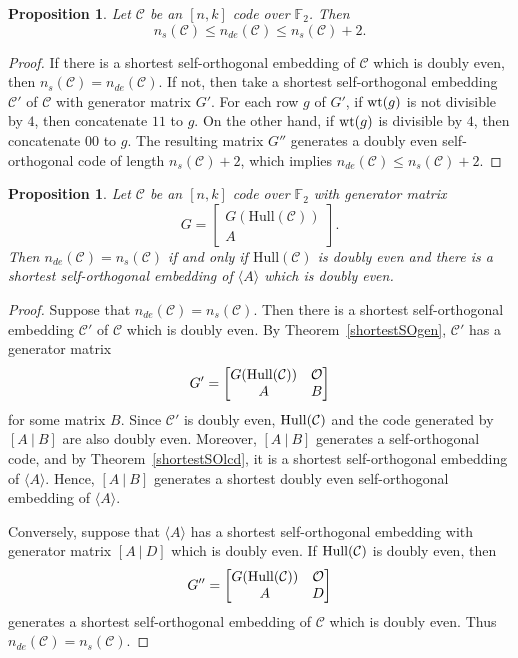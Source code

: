 \documentclass{article}
\newtheorem{proposition}[theorem]{Proposition}
\theoremstyle{definition}
\theoremstyle{remark}
\begin{document}
\begin{proposition}
    Let $\mathcal{C}$ be an $[n, k]$ code over $\mathbb{F}_2$. Then
    \[
    n_s(\mathcal{C})\le n_{de}(\mathcal{C})\le n_s(\mathcal{C})+2.
    \]
\end{proposition}
\begin{proof}
    If there is a shortest self-orthogonal embedding of $\mathcal{C}$ which is doubly even, then $n_s(\mathcal{C})=n_{de}(\mathcal{C})$. If not, then take a shortest self-orthogonal embedding $\mathcal{C}'$ of $\mathcal{C}$ with generator matrix $G'$. For each row $g$ of $G'$, if ${\rm{wt}}(g)$ is not divisible by $4$, then concatenate $11$ to $g$. On the other hand, if ${\rm{wt}}(g)$ is divisible by $4$, then concatenate $00$ to $g$. The resulting matrix $G''$ generates a doubly even self-orthogonal code of length $n_s(\mathcal{C})+2$, which implies $n_{de}(\mathcal{C})\le n_s(\mathcal{C})+2$.
\end{proof}

\begin{proposition}\label{deequals}
    Let $\mathcal{C}$ be an $[n, k]$ code over $\mathbb{F}_2$ with generator matrix
    \[
    G=\begin{bmatrix}
        G(\mathrm{Hull}(\mathcal{C}))\\A
    \end{bmatrix}.
    \]
    Then $n_{de}(\mathcal{C})=n_s(\mathcal{C})$ if and only if $\mathrm{Hull}(\mathcal{C})$ is doubly even and there is a shortest self-orthogonal embedding of $\langle A\rangle$ which is doubly even.
\end{proposition}
\begin{proof}
    Suppose that $n_{de}(\mathcal{C})=n_s(\mathcal{C})$. Then there is a shortest self-orthogonal embedding $\mathcal{C}'$ of $\mathcal{C}$ which is doubly even. By Theorem~\ref{shortestSOgen}, $\mathcal{C}'$ has a generator matrix
    \[
    G'=\begin{bmatrix}G({\rm Hull}(\mathcal{C})) & \mathcal{O}\\A & B \end{bmatrix}
    \]
    for some matrix $B$. Since $\mathcal{C}'$ is doubly even, ${\rm{Hull}}(\mathcal{C})$ and the code generated by $[A~|~B]$ are also doubly even. Moreover, $[A~|~B]$ generates a self-orthogonal code, and by Theorem~\ref{shortestSOlcd}, it is a shortest self-orthogonal embedding of $\langle A\rangle$. Hence, $[A~|~B]$ generates a shortest doubly even self-orthogonal embedding of $\langle A\rangle$.

    Conversely, suppose that $\langle A\rangle$ has a shortest self-orthogonal embedding with generator matrix $[A~|~D]$ which is doubly even. If ${\rm{Hull}}(\mathcal{C})$ is doubly even, then
    \[
    G''=\begin{bmatrix}G({\rm Hull}(\mathcal{C})) & \mathcal{O}\\A & D \end{bmatrix}
    \]
    generates a shortest self-orthogonal embedding of $\mathcal{C}$ which is doubly even. Thus $n_{de}(\mathcal{C})=n_s(\mathcal{C})$.
\end{proof}
\end{document}
